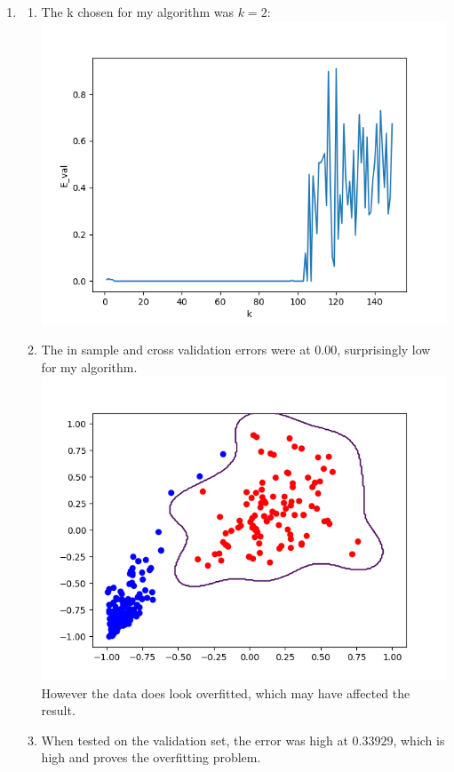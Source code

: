 \documentclass{article}
\begin{document}
\begin{enumerate}
        \item \begin{enumerate}[label=(\alph*)]
            \item The k chosen for my algorithm was $k = 2$: \\ \includegraphics[scale=0.5]{images/2_a_1.png}
            \item The in sample and cross validation errors were at $0.00$, surprisingly low for my algorithm. \\ \includegraphics[scale=0.5]{images/2_b.png}\\However the data does look overfitted, which may have affected the result.
            \item When tested on the validation set, the error was high at $0.33929$, which is high and proves the overfitting problem.
        \end{enumerate}


\end{enumerate}
\end{document}
